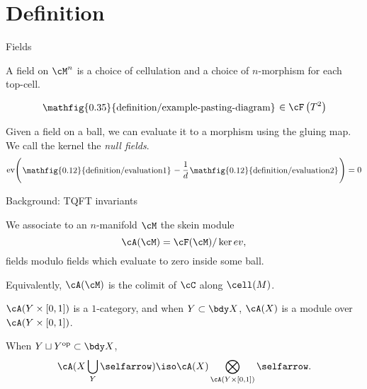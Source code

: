 \documentclass[beamer, compress]{beamer}
\begin{document}
\newcommand{\roundframe}[1]{\begin{tikzpicture}[baseline=-2pt]\node[rectangle,inner sep=1pt,rounded corners,fill=white] {#1};\end{tikzpicture}}

\section{Definition}
\begin{frame}{Fields}
\begin{block}{}
A field on $\cM^n$ is a choice of cellulation and a choice of $n$-morphism for each top-cell.
\end{block}
\begin{example}[$\cC = \text{TL}_d$ the Temperley-Lieb category]
$$\roundframe{\mathfig{0.35}{definition/example-pasting-diagram}} \in \cF\left(T^2\right)$$
\end{example}
\begin{block}{}
Given a field on a ball, we can evaluate it to a morphism using the gluing map. We call the kernel the \emph{null fields}.
\vspace{-3mm}
$$\text{ev}\Bigg(\roundframe{\mathfig{0.12}{definition/evaluation1}} - \frac{1}{d}\roundframe{\mathfig{0.12}{definition/evaluation2}}\Bigg) = 0$$
\end{block}
\end{frame}

\begin{frame}{Background: TQFT invariants}
\begin{defn}
We associate to an $n$-manifold $\cM$ the skein module
\vspace{-1mm}
$$\cA(\cM) = \cF(\cM) / \ker{ev},\vspace{-1mm}$$
fields modulo fields which evaluate to zero inside some ball.
\end{defn}
Equivalently, $\cA(\cM)$ is the colimit of $\cC$ along $\cell(M)$.

\vspace{4mm}
$\cA(Y \times [0,1])$ is a $1$-category, and when $Y \subset \bdy X$, $\cA(X)$ is a module over $\cA(Y \times [0,1])$.
\begin{thm}
When $Y \sqcup Y^{\text{op}} \subset \bdy X$,
\vspace{-1mm}
\[
	\cA(X \bigcup_Y \selfarrow) \iso \cA(X) \bigotimes_{\cA(Y \times [0,1])} \selfarrow.
\]
\end{thm}
\end{frame}
\end{document}
